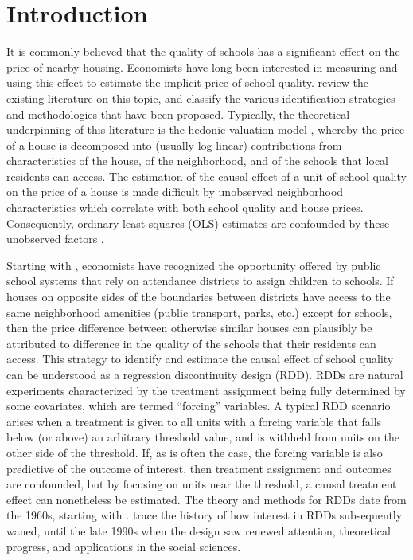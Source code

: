 \section{Introduction}\label{sec:geordd_introduction}

It is commonly believed that the quality of schools has a significant effect on the price of nearby housing.
Economists have long been interested in measuring and using this effect to estimate the implicit price of school quality.
\citet{black2011housing} review the existing literature on this topic, and classify the various identification strategies and methodologies that have been proposed.
Typically, the theoretical underpinning of this literature is the hedonic valuation model \citep{rosen1974hedonic,sheppard1999hedonic}, whereby the price of a house is decomposed into (usually log-linear) contributions from characteristics of the house, of the neighborhood, and of the schools that local residents can access.
The estimation of the causal effect of a unit of school quality on the price of a house is made difficult by unobserved neighborhood characteristics which correlate with both school quality and house prices.
Consequently, ordinary least squares (OLS) estimates are confounded by these unobserved factors \citep{black2011housing}.

Starting with \citet{black1999better}, economists have recognized the opportunity offered by public school systems that rely on attendance districts to assign children to schools.
If houses on opposite sides of the boundaries between districts have access to the same neighborhood amenities (public transport, parks, etc.) except for schools, then the price difference between otherwise similar houses can plausibly be attributed to difference in the quality of the schools that their residents can access.
This strategy to identify and estimate the causal effect of school quality can be understood as a regression discontinuity design (RDD).
RDDs are natural experiments characterized by the treatment assignment being fully determined by some covariates, which are termed ``forcing'' variables.
A typical RDD scenario arises when a treatment is given to all units with a forcing variable that falls below (or above) an arbitrary threshold value, and is withheld from units on the other side of the threshold.
If, as is often the case, the forcing variable is also predictive of the outcome of interest, then treatment assignment and outcomes are confounded, but by focusing on units near the threshold, a causal treatment effect can nonetheless be estimated.
The theory and methods for RDDs date from the 1960s, starting with \citet{thistlethwaite1960regression}.
\citet{cook2008waiting} trace the history of how interest in RDDs subsequently waned, until the late 1990s when the design saw renewed attention, theoretical progress, and applications in the social sciences.


